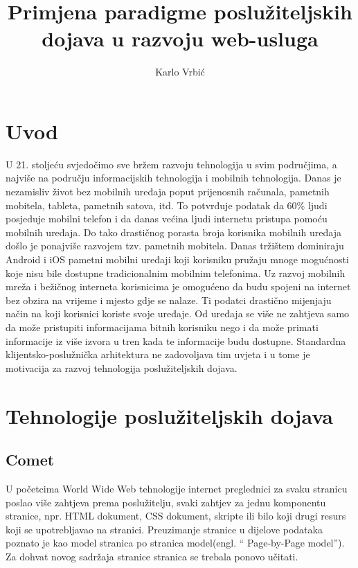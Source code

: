 \documentclass[times, utf8, zavrsni]{fer}
\begin{document}
\title{Primjena paradigme poslužiteljskih dojava u razvoju web-usluga}
\author{Karlo Vrbić}

\maketitle

\zahvala{}

\tableofcontents

\chapter{Uvod}

U 21. stoljeću svjedočimo sve bržem razvoju tehnologija u svim područjima, a najviše na području informacijskih tehnologija i mobilnih tehnologija. Danas je nezamisliv život bez mobilnih uređaja poput prijenosnih računala, pametnih mobitela, tableta, pametnih satova, itd. To potvrđuje podatak da 60\% ljudi posjeduje mobilni telefon i da danas većina ljudi internetu pristupa pomoću mobilnih uređaja. Do tako drastičnog porasta broja korisnika mobilnih uređaja došlo je ponajviše razvojem tzv. pametnih mobitela. Danas tržištem dominiraju Android i iOS pametni mobilni uređaji koji korisniku pružaju mnoge mogućnosti koje nisu bile dostupne tradicionalnim mobilnim telefonima. Uz razvoj mobilnih mreža i bežičnog interneta korisnicima je omogućeno da budu spojeni na internet bez obzira na vrijeme i mjesto gdje se nalaze. Ti podatci drastično mijenjaju način na koji korisnici koriste svoje uređaje. Od uređaja se više ne zahtjeva samo da može pristupiti informacijama bitnih korisniku nego i da može primati informacije iz više izvora u tren kada te informacije budu dostupne. Standardna klijentsko-poslužnička arhitektura ne zadovoljava tim uvjeta i u tome je motivacija za razvoj tehnologija poslužiteljskih dojava.


\chapter{Tehnologije poslužiteljskih dojava}

\section{Comet}
U početcima World Wide Web tehnologije internet preglednici za svaku stranicu poslao više zahtjeva prema poslužitelju, svaki zahtjev za jednu komponentu stranice, npr. HTML dokument, CSS dokument, skripte ili bilo koji drugi resurs koji se upotrebljavao na stranici. Preuzimanje stranice u dijelove podataka poznato je kao model stranica po stranica model(engl. ``	Page-by-Page model''). Za dohvat novog sadržaja stranice stranica se trebala ponovo učitati.
\end{document}

